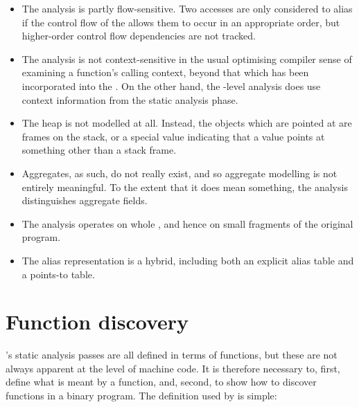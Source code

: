 \begin{itemize}
\item
  The analysis is partly flow-sensitive.  Two accesses are only
  considered to alias if the control flow of the {\StateMachine}
  allows them to occur in an appropriate order, but higher-order
  control flow dependencies are not tracked.  
\item
  The analysis is not context-sensitive in the usual optimising
  compiler sense of examining a function's calling context, beyond
  that which has been incorporated into the {\StateMachine}.  On the
  other hand, the {\StateMachine}-level analysis does use context
  information from the static analysis phase.
\item
  The heap is not modelled at all.  Instead, the objects which are
  pointed at are frames on the stack, or a special value indicating
  that a value points at something other than a stack frame.
\item
  Aggregates, as such, do not really exist, and so aggregate modelling
  is not entirely meaningful.  To the extent that it does mean
  something, the analysis distinguishes aggregate fields.
\item
  The analysis operates on whole {\StateMachines}, and hence on small
  fragments of the original program.
\item
  The alias representation is a hybrid, including both an explicit
  alias table and a points-to table. 
\end{itemize}

\section{Function discovery}
\label{sect:program_model:functions}


{\Technique}'s static analysis passes are all defined in terms of functions,
but these are not always apparent at the level of machine code.  It is
therefore necessary to, first, define what is meant by a function,
and, second, to show how to discover functions in a binary program.
The definition used by {\technique} is simple:


